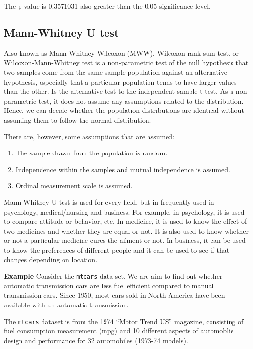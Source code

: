 \documentclass[]{article}
\def\tightlist{}
\numberwithin{equation}{section}
\begin{document}
The p-value is 0.3571031 also greater than the 0.05 significance level.

\subsection{Mann-Whitney U test}\label{mann-whitney-u-test}

Also known as Mann-Whitney-Wilcoxon (MWW), Wilcoxon rank-sum test, or
Wilcoxon-Mann-Whitney test is a non-parametric test of the null
hypothesis that two samples come from the same sample population against
an alternative hypothesis, especially that a particular population tends
to have larger values than the other. Is the alternative test to the
independent sample t-test. As a non-parametric test, it does not assume
any assumptions related to the distribution. Hence, we can decide
whether the population distributions are identical without assuming them
to follow the normal distribution.

There are, however, some assumptions that are assumed:

\begin{enumerate}
\def\labelenumi{\arabic{enumi}.}
\tightlist
\item
  The sample drawn from the population is random.
\item
  Independence within the samples and mutual independence is assumed.
\item
  Ordinal measurement scale is assumed.
\end{enumerate}

Mann-Whitney U test is used for every field, but in frequently used in
psychology, medical/nursing and business. For example, in psychology, it
is used to compare attitude or behavior, etc. In medicine, it is used to
know the effect of two medicines and whether they are equal or not. It
is also used to know whether or not a particular medicine cures the
ailment or not. In business, it can be used to know the preferences of
different people and it can be used to see if that changes depending on
location.

\textbf{Example} Consider the \texttt{mtcars} data set. We are aim to
find out whether automatic transmission cars are less fuel efficient
compared to manual transmission cars. Since 1950, most cars sold in
North America have been available with an automatic transmission.

The \texttt{mtcars} dataset is from the 1974 ``Motor Trend US''
magazine, consisting of fuel consumption measurement (mpg) and 10
different aspects of automoblie design and performance for 32
automobiles (1973-74 models).
\end{document}

